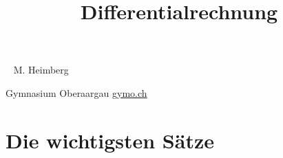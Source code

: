 \documentclass[justified,openany,nofonts]{tufte-book}
\title{Differentialrechnung}
\begin{document}
\maketitle



\begin{fullwidth}
~\vfill
\thispagestyle{empty}
\setlength{\parindent}{0pt}
\setlength{\parskip}{\baselineskip}
M. Heimberg

Gymnasium Oberaargau \url{gymo.ch}



\end{fullwidth}


\tableofcontents





\chapter*{Die wichtigsten Sätze}%







\setcounter{chapter}{-1}
\end{document}
